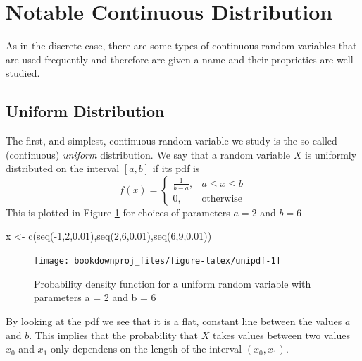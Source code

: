 \documentclass[
]{book}
\newenvironment{Shaded}{\begin{snugshade}}{\end{snugshade}}
\newcommand{\DecValTok}[1]{\textcolor[rgb]{0.00,0.00,0.81}{#1}}
\newcommand{\FloatTok}[1]{\textcolor[rgb]{0.00,0.00,0.81}{#1}}
\newcommand{\FunctionTok}[1]{\textcolor[rgb]{0.00,0.00,0.00}{#1}}
\newcommand{\NormalTok}[1]{#1}
\newcommand{\OtherTok}[1]{\textcolor[rgb]{0.56,0.35,0.01}{#1}}
\newcommand{\SpecialCharTok}[1]{\textcolor[rgb]{0.00,0.00,0.00}{#1}}
\theoremstyle{definition}
\theoremstyle{definition}
\theoremstyle{definition}
\theoremstyle{definition}
\theoremstyle{remark}
\begin{document}
\hypertarget{notable-continuous-distribution}{%
\section{Notable Continuous Distribution}\label{notable-continuous-distribution}}

As in the discrete case, there are some types of continuous random variables that are used frequently and therefore are given a name and their proprieties are well-studied.

\hypertarget{uniform-distribution}{%
\subsection{Uniform Distribution}\label{uniform-distribution}}

The first, and simplest, continuous random variable we study is the so-called (continuous) \emph{uniform} distribution. We say that a random variable \(X\) is uniformly distributed on the interval \([a,b]\) if its pdf is
\[
f(x)=\left\{ 
\begin{array}{ll}
\frac{1}{b-a}, & a\leq x \leq b\\
0, & \mbox{otherwise} 
\end{array}
\right.
\]
This is plotted in Figure \ref{fig:unipdf} for choices of parameters \(a=2\) and \(b=6\)

\begin{Shaded}
\begin{Highlighting}[]
\NormalTok{x }\OtherTok{\textless{}{-}} \FunctionTok{c}\NormalTok{(}\FunctionTok{seq}\NormalTok{(}\SpecialCharTok{{-}}\DecValTok{1}\NormalTok{,}\DecValTok{2}\NormalTok{,}\FloatTok{0.01}\NormalTok{),}\FunctionTok{seq}\NormalTok{(}\DecValTok{2}\NormalTok{,}\DecValTok{6}\NormalTok{,}\FloatTok{0.01}\NormalTok{),}\FunctionTok{seq}\NormalTok{(}\DecValTok{6}\NormalTok{,}\DecValTok{9}\NormalTok{,}\FloatTok{0.01}\NormalTok{))}
\end{Highlighting}
\end{Shaded}

\begin{figure}

{\centering \texttt{[image: bookdownproj\_files/figure-latex/unipdf-1]} 

}

\caption{Probability density function for a uniform random variable with parameters a = 2 and b = 6}\label{fig:unipdf}
\end{figure}

By looking at the pdf we see that it is a flat, constant line between the values \(a\) and \(b\). This implies that the probability that \(X\) takes values between two values \(x_0\) and \(x_1\) only dependens on the length of the interval \((x_0,x_1)\).
\end{document}
